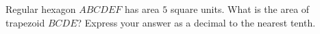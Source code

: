Regular hexagon $ABCDEF$ has area $5$ square units. What is the area of trapezoid $BCDE$? Express your answer as a decimal to the nearest tenth.
